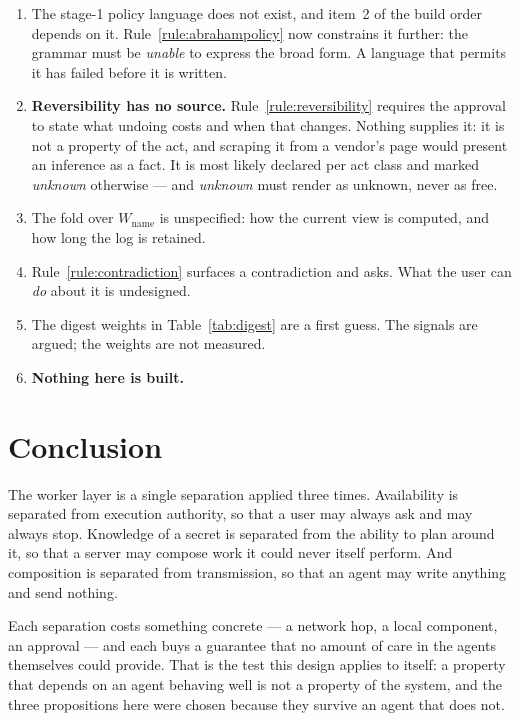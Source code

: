 \documentclass[11pt]{article}
\begin{document}
\begin{enumerate}
\item The stage-1 policy language does not exist, and item~2 of the build order depends on it. Rule~\ref{rule:abrahampolicy} now constrains it further: the grammar must be \emph{unable} to express the broad form. A language that permits it has failed before it is written.
\item \textbf{Reversibility has no source.} Rule~\ref{rule:reversibility} requires the approval to state what undoing costs and when that changes. Nothing supplies it: it is not a property of the act, and scraping it from a vendor's page would present an inference as a fact. It is most likely declared per act class and marked \emph{unknown} otherwise --- and \emph{unknown} must render as unknown, never as free.
\item The fold over $W_{\text{name}}$ is unspecified: how the current view is computed, and how long the log is retained.
\item Rule~\ref{rule:contradiction} surfaces a contradiction and asks. What the user can \emph{do} about it is undesigned.
\item The digest weights in Table~\ref{tab:digest} are a first guess. The signals are argued; the weights are not measured.
\item \textbf{Nothing here is built.}
\end{enumerate}

\section{Conclusion}
\label{sec:conclusion}

The worker layer is a single separation applied three times. Availability is separated from execution authority, so that a user may always ask and may always stop. Knowledge of a secret is separated from the ability to plan around it, so that a server may compose work it could never itself perform. And composition is separated from transmission, so that an agent may write anything and send nothing.

Each separation costs something concrete --- a network hop, a local component, an approval --- and each buys a guarantee that no amount of care in the agents themselves could provide. That is the test this design applies to itself: a property that depends on an agent behaving well is not a property of the system, and the three propositions here were chosen because they survive an agent that does not.
\end{document}
